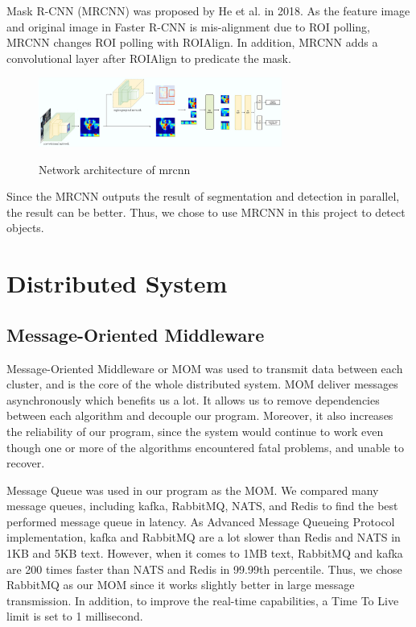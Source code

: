 \documentclass[runningheads]{llncs}
\begin{document}
Mask R-CNN\cite{MaskRCNN} (MRCNN) was proposed by He et al. 
in 2018. As the feature image and original image in Faster 
R-CNN is mis-alignment due to ROI polling, MRCNN changes ROI 
polling with ROIAlign. In addition, MRCNN adds a 
convolutional layer after ROIAlign to predicate the mask. 

\begin{figure}
    \centering
    \includegraphics[width=8cm]{reference/mrcnn}
    \label{fig:MRCNN}
    \caption{Network architecture of mrcnn}
\end{figure}

Since the MRCNN outputs the result of segmentation and 
detection in parallel, the result can be better. Thus, 
we chose to use MRCNN in this project to detect objects.


\section{Distributed System}

\subsection{Message-Oriented Middleware}
Message-Oriented Middleware or MOM was used to transmit 
data between each cluster, and is the core of the whole 
distributed system. MOM deliver messages asynchronously 
which benefits us a lot. It allows us to remove 
dependencies between each algorithm and decouple our 
program. Moreover, it also increases the reliability of our 
program, since the system would continue to work even 
though one or more of the algorithms encountered fatal 
problems, and unable to recover.

Message Queue was used in our program as the MOM. We 
compared many message queues, including kafka, RabbitMQ, 
NATS, and Redis to find the best performed message queue 
in latency. As Advanced Message Queueing Protocol 
implementation, kafka and RabbitMQ are a lot slower than 
Redis and NATS in 1KB and 5KB text. However, when it comes
to 1MB text, RabbitMQ and kafka are 200 times faster than 
NATS and Redis in 99.99th percentile. Thus, we chose 
RabbitMQ as our MOM since it works slightly better in large 
message transmission. In addition, to improve the real-time 
capabilities, a Time To Live limit is set to 1 millisecond.
\end{document}
